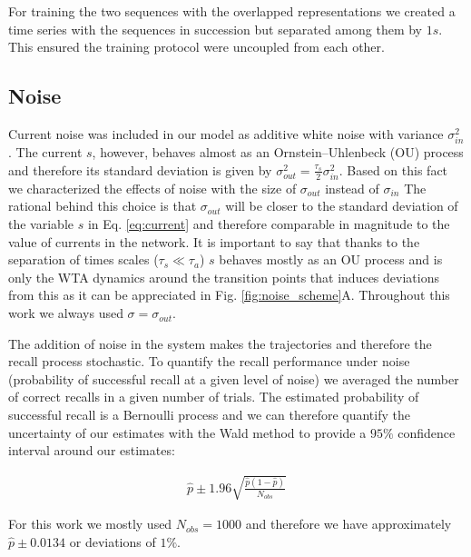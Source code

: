 \documentclass[10pt,a4paper]{article}
\begin{document}
For training the two sequences with the overlapped representations we created a time series with the sequences in succession but separated among them by $1s$. This ensured the training protocol were uncoupled from each other.

\subsection{Noise}
Current noise was included in our model as additive white noise with variance $\sigma_{in}^2$. The current $s$, however, behaves almost as an Ornstein–Uhlenbeck (OU) process and therefore its standard deviation is given by $\sigma_{out}^2 = \frac{\tau_s}{2} \sigma_{in}^2$. Based on this fact we characterized the effects of noise with the size of $\sigma_{out}$ instead of $\sigma_{in}$ The rational behind this choice is that $\sigma_{out}$ will be closer to the standard deviation of the variable $s$ in Eq. \ref{eq:current} and therefore comparable in magnitude to the value of currents in the network. It is important to say that thanks to the separation of times scales ($\tau_s \ll \tau_a$) $s$ behaves mostly as an OU process and is only the WTA dynamics around the transition points that induces deviations from this as it can be appreciated in Fig. \ref{fig:noise_scheme}A. Throughout this work we always used $\sigma = \sigma_{out}$. 

The addition of noise in the system makes the trajectories and therefore the recall process stochastic. To quantify the recall performance under noise (probability of successful recall at a given level of noise) we averaged the number of correct recalls in a given number of trials. The estimated probability of successful recall is a Bernoulli process and we can therefore quantify the uncertainty of our estimates with the Wald method to provide a $95 \% $ confidence interval around our estimates:

\begin{align} 
\hat{p} \pm 1.96\sqrt{\frac{\hat{p}(1 - \hat{p})}{N_{obs} }} \label{eq:confidence}
\end{align}

For this work we mostly used $N_{obs}=1000$ and therefore we have approximately $\hat{p} \pm 0.0134$ or deviations of $1 \%$.  
\end{document}
